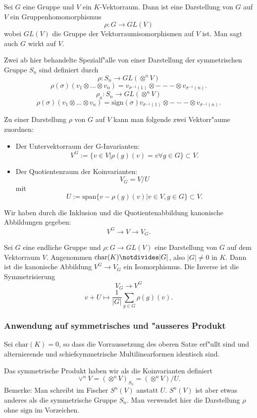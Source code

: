 \documentclass[11pt, a4paper]{article}
\begin{document}
\begin{definition}
Sei $G$ eine Gruppe und $V$ ein $K$-Vektorraum. Dann ist eine Darstellung von $G$ auf $V$ ein Gruppenhomomorphismus
$$
\rho : G \rightarrow GL(V)
$$
wobei $GL(V)$ die Gruppe der Vektorraumisomorphismen auf $V$ ist. Man sagt auch $G$ wirkt auf $V$.
\end{definition}

\begin{example}
Zwei ab hier behandelte Spezialf"alle von einer Darstellung der symmetrischen Gruppe $S_n$ sind definiert durch
$$
\rho: S_n \rightarrow GL(\otimes^n V)
$$
$$
\rho(\sigma)(v_1 \otimes ... \otimes v_n) = v_{\sigma^{-1}(1)} \otimes --- \otimes v_{\sigma^{-1}(n)}.
$$
$$
\rho_a: S_n \rightarrow GL(\otimes^n V)
$$
$$
\rho(\sigma)(v_1 \otimes ... \otimes v_n) = \mathrm{sign}(\sigma) v_{\sigma^{-1}(1)} \otimes --- \otimes v_{\sigma^{-1}(n)}.
$$
\end{example}

\begin{definition}
Zu einer Darstellung $\rho$ von $G$ auf $V$ kann man folgende zwei Vektorr"aume zuordnen:
\begin{itemize}
\item Der Untervektorraum der G-Invarianten:
$$
V^G := \{ v \in V | \rho(g)(v) = v \forall g \in G \} \subset V.
$$
\item Der Quotientenraum der Koinvarianten:
$$
V_G = V/U
$$
mit
$$
U := \mathrm{span}\{v - \rho(g)(v) | v \in V, g \in G \} \subset V.
$$
\end{itemize}
Wir haben durch die Inklusion und die Quotientenabbildung kanonische Abbildungen gegeben:
$$
V^G \rightarrow V \rightarrow V_G.
$$
\end{definition}


\begin{theorem}
Sei $G$ eine endliche Gruppe und $\rho : G \rightarrow GL(V) $ eine Darstellung von $G$ auf dem Vektorraum $V$. Angenommen $\mathrm{char}(K) \notdivides |G|$, also $|G| \neq 0$ in $K$. Dann ist die kanonische Abbildung $V^G \rightarrow V_G$ ein Isomorphismus. Die Inverse ist die Symmetrisierung
$$
V_G \rightarrow V^G
$$
$$
v + U \mapsto \frac{1}{|G|}\sum\limits_{g \in G} \rho(g)(v).
$$
\end{theorem}

\subsubsection{Anwendung auf symmetrisches und "ausseres Produkt}
Sei $\mathrm{char}(K) = 0$, so dass die Vorraussetzung des oberen Satze erf"ullt sind und alternierende und schiefsymmetrische Multilinearformen identisch sind. 
\begin{remark}
Das symmetrische Produkt haben wir als die Koinvarianten definiert
$$
\vee^nV = (\otimes^n V)_{S_n} = (\otimes^n V) / U.
$$
Bemerke: Man schreibt im Fischer $S^n(V)$ anstatt $U$. $S^n(V)$ ist aber etwas anderes als die symmetrische Gruppe $S_n$.
Man verwendet hier die Darstellung $\rho$ ohne $\mathrm{sign}$ im Vorzeichen.
\end{remark}
\end{document}
